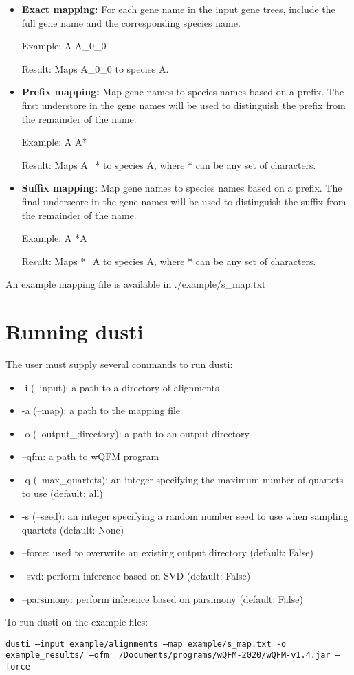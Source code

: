 \documentclass{scrartcl}
\begin{document}
\begin{itemize}

    \item \textbf{Exact mapping:} For each gene name in the input gene trees, include the full gene name and the corresponding species name.

    Example: A    A\_0\_0

    Result: Maps A\_0\_0 to species A.

    \item \textbf{Prefix mapping:} Map gene names to species names based on a prefix. The first understore in the gene names will be used to distinguish the prefix from the remainder of the name.
    
    Example: A    A*

    Result: Maps A\_* to species A, where * can be any set of characters.

    \item \textbf{Suffix mapping:} Map gene names to species names based on a prefix. The final underscore in the gene names will be used to distinguish the suffix from the remainder of the name.
    
    Example: A    *A

    Result: Maps *\_A to species A, where * can be any set of characters.

\end{itemize}

An example mapping file is available in ./example/s\_map.txt

\section{Running dusti}

The user must supply several commands to run dusti:

\begin{itemize}
    \item -i (--input): a path to a directory of alignments
    \item -a (--map): a path to the mapping file
    \item -o (--output\_directory): a path to an output directory
    \item --qfm: a path to wQFM program
    \item -q (--max\_quartets): an integer specifying the maximum number of quartets to use (default: all)
    \item -s (--seed): an integer specifying a random number seed to use when sampling quartets (default: None)
    \item --force: used to overwrite an existing output directory (default: False)
    \item --svd: perform inference based on SVD (default: False)
    \item --parsimony: perform inference based on parsimony (default: False)
\end{itemize}

To run dusti on the example files:


\texttt{dusti --input example/alignments --map example/s\_map.txt -o example\_results/ --qfm ~/Documents/programs/wQFM-2020/wQFM-v1.4.jar --force}
\end{document}
